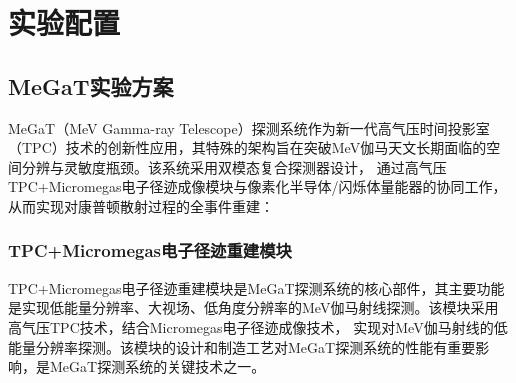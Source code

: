 \chapter{实验配置}
\label{chap:inverseproblem}
\section{MeGaT实验方案}
MeGaT（MeV Gamma-ray Telescope）探测系统作为新一代高气压时间投影室（TPC）技术的创新性应用，其特殊的架构旨在突破MeV伽马天文长期面临的空间分辨与灵敏度瓶颈。该系统采用双模态复合探测器设计，
通过高气压TPC+Micromegas电子径迹成像模块与像素化半导体/闪烁体量能器的协同工作，从而实现对康普顿散射过程的全事件重建：
\subsection{TPC+Micromegas电子径迹重建模块}
	TPC+Micromegas电子径迹重建模块是MeGaT探测系统的核心部件，其主要功能是实现低能量分辨率、大视场、低角度分辨率的MeV伽马射线探测。该模块采用高气压TPC技术，结合Micromegas电子径迹成像技术，
	实现对MeV伽马射线的低能量分辨率探测。该模块的设计和制造工艺对MeGaT探测系统的性能有重要影响，是MeGaT探测系统的关键技术之一。\par
